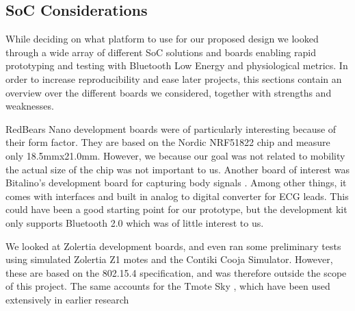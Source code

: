 
\subsection{SoC Considerations} %
\label{sub:soc_considerations}

While deciding on what platform to use for our proposed design we looked through a wide array of different SoC solutions and boards enabling rapid prototyping and testing with Bluetooth Low Energy and physiological metrics. In order to increase reproducibility and ease later projects, this sections contain an overview over the different boards we considered, together with strengths and weaknesses.

RedBears Nano \cite{newRef_36} development boards were of particularly interesting because of their form factor. They are based on the Nordic NRF51822 chip and measure only 18.5mmx21.0mm. However, we because our goal was not related to mobility the actual size of the chip was not important to us. Another board of interest was Bitalino's development board for capturing body signals \cite{newRef_37}. Among other things, it comes with interfaces and built in analog to digital converter for ECG leads. This could have been a good starting point for our prototype, but the development kit only supports Bluetooth 2.0 which was of little interest to us.

We looked at Zolertia \cite{newRef_38} development boards, and even ran some preliminary tests using simulated Zolertia Z1 motes and the Contiki Cooja Simulator. However, these are based on the 802.15.4 specification, and was therefore outside the scope of this project. The same accounts for the Tmote Sky \cite{newRef_39}, which have been used extensively in earlier research \cite{Milenkovic:2006er, Owner:2006ub, ChulsungPark:2006tf, SteveWarren:2005ws, ChulsungPark:2006tf, Anonymous:GyP6wjY5}

